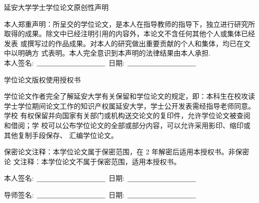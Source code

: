 

\newpage
\vspace*{20pt}
\begin{center}
	{\heiti{}延安大学学士学位论文原创性声明}
\end{center}
\par%
\renewcommand{\baselinestretch}{2}

{%

本人郑重声明：所呈交的学位论文，是本人在指导教师的指导下，独立进行研究所 取得的成果。除文中已经注明引用的内容外，本论文不含任何其他个人或集体已经发表 或撰写过的作品成果。对本人的研究做出重要贡献的个人和集体，均已在文中以明确方 式表明。本人完全意识到本声明的法律结果由本人承担.\\[1cm]
\hspace*{1cm}本人签名: $\underline{\hspace{3.5cm}}$
\hspace{2cm}日期: $\underline{\hspace{3.5cm}}$\hfill\par}
\vskip10mm
\begin{center}
	{\heiti{}学位论文版权使用授权书}
\end{center}

{%
	
学位论文作者完全了解延安大学有关保留和学位论文的规定，即：本科生在校攻读 学士学位期间论文工作的知识产权属延安大学，学士公开发表需经指导老师同意。学校 有权保留并向国家有关部门或机构送交论文的复印件，允许学位论文被查阅和借阅；学 校可以公布学位论文的全部或部分内容，可以允许采用影印、缩印或其他复制手段保存、 汇编学位论文。

保密论文注释：本学位论文属于保密范围，在 2 年解密后适用本授权书。非保密论 文注释：本学位论文不属于保密范围，适用本授权书。

	
	\hspace*{1cm}本人签名: $\underline{\hspace{3.5cm}}$
	\hspace{2cm}日期: $\underline{\hspace{3.5cm}}$\hfill\par 
	\vskip5mm
	\hspace*{1cm}导师签名: $\underline{\hspace{3.5cm}}$
	\hspace{2cm}日期: $\underline{\hspace{3.5cm}}$\hfill\par}
\baselineskip=18pt  %





